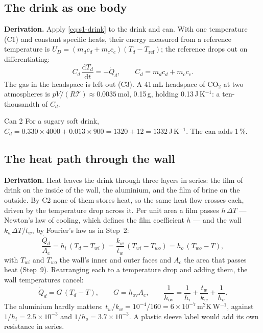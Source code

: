 \documentclass[11pt,a4paper]{article}
\newcommand{\dd}{\mathrm{d}}
\newcommand{\hov}{h_{\mathrm{ov}}}
\newcommand{\Tabs}{\mathcal{T}}
\newcommand{\para}[1]{\par\smallskip\noindent\textbf{#1}\enspace}
\begin{document}
\subsection{The drink as one body}
\para{Derivation.} Apply \eqref{eq:s1-drink} to the drink and can. With one temperature (C1) and constant
specific heats, their energy measured from a reference temperature is
$U_D = (m_dc_d + m_cc_c)(T_d - T_{\mathrm{ref}})$; the reference drops out on differentiating:
\begin{equation}
C_d\,\frac{\dd T_d}{\dd t} = -\dot Q_d, \qquad C_d = m_dc_d + m_cc_c. \label{eq:s8-drink}
\end{equation}
The gas in the headspace is left out (C3). A 41\,mL headspace of CO$_2$ at two atmospheres is
$pV/(R\Tabs) \approx 0.0035$\,mol, 0.15\,g, holding 0.13\,J\,K$^{-1}$: a ten-thousandth of $C_d$.

\begin{worked}{Can 2}
For a sugary soft drink, $C_d = 0.330\times4000 + 0.013\times900 = 1320 + 12 = 1332$\,J\,K$^{-1}$. The can
adds 1\,\%.
\end{worked}

\subsection{The heat path through the wall}
\para{Derivation.} Heat leaves the drink through three layers in series: the film of drink on the inside of
the wall, the aluminium, and the film of brine on the outside. By C2 none of them stores heat, so the same
heat flow crosses each, driven by the temperature drop across it. Per unit area a film passes $h\,\Delta T$
--- Newton's law of cooling, which defines the film coefficient $h$ --- and the wall $k_w\Delta T/t_w$, by
Fourier's law as in Step~2:
\[
\frac{\dot Q_d}{A_c} = h_i\,(T_d - T_{wi}) = \frac{k_w}{t_w}\,(T_{wi} - T_{wo}) = h_o\,(T_{wo} - T),
\]
with $T_{wi}$ and $T_{wo}$ the wall's inner and outer faces and $A_c$ the area that passes heat (Step~9).
Rearranging each to a temperature drop and adding them, the wall temperatures cancel:
\begin{equation}
\dot Q_d = G\,(T_d - T),\qquad G = \hov A_c,\qquad \frac{1}{\hov} = \frac{1}{h_i} + \frac{t_w}{k_w} + \frac{1}{h_o}. \label{eq:s8-G}
\end{equation}
The aluminium hardly matters: $t_w/k_w = 10^{-4}/160 = 6\times10^{-7}$\,m$^2$K\,W$^{-1}$, against
$1/h_i = 2.5\times10^{-3}$ and $1/h_o = 3.7\times10^{-3}$. A plastic sleeve label would add its own
resistance in series.
\end{document}
